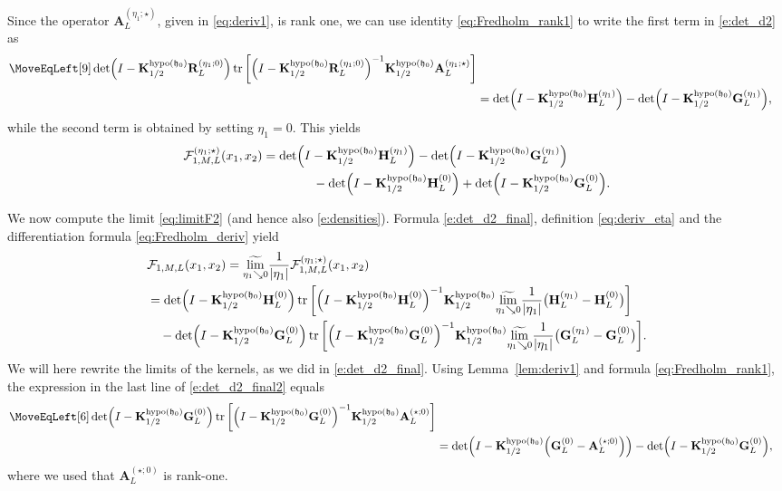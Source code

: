 \documentclass[oneside,final,11pt]{amsart}
\theoremstyle{definition}
\newcommand{\fh}{\mathfrak{h}}
\newcommand{\mylim}[1]{\underset{#1}{\wt{\mathrm{lim}}}}
\newcommand{\dens}{\CF}
\newcommand{\1}[1]{\mathbf{1}_{#1}}
\newcommand{\wt}{\widetilde}
\newcommand{\uptext}[1]{\text{\upshape{#1}}}
\DeclareMathOperator{\hypo}{\uptext{hypo}}
\DeclareMathOperator{\tr}{\mathop{\uptext{tr}}}
\newcommand{\fA}{\mathbf{A}}
\newcommand{\fK}{\mathbf{K}}
\newcommand{\fR}{\mathbf{R}}
\newcommand{\fG}{\mathbf{G}}
\newcommand{\fH}{\mathbf{H}}
\newcommand{\CF}{\mathcal{F}}
\numberwithin{equation}{section}
\begin{document}
Since the operator $\fA_L^{(\eta_1; \star)}$, given in  \eqref{eq:deriv1}, is rank one, we can use identity \eqref{eq:Fredholm_rank1} to write the first term in \eqref{e:det_d2} as
\begin{align}
\MoveEqLeft[9]
\det \Bigl(I- \fK^{\hypo(\fh_0)}_{1/2} \fR_L^{(\eta_1; 0)} \Bigr) \tr\bigg[\Bigl(I - \fK^{\hypo(\fh_0)}_{1/2} \fR_L^{(\eta_1; 0)}\Bigr)^{-1} \fK^{\hypo(\fh_0)}_{1/2} \fA_L^{(\eta_1; \star)}\bigg]\\
&= \det\Bigl(I- \fK^{\hypo(\fh_0)}_{1/2} \fH_L^{(\eta_1)} \Bigr) - \det\Bigl(I- \fK^{\hypo(\fh_0)}_{1/2} \fG_L^{(\eta_1)}\Bigr),
\end{align}
while the second term is obtained by setting $\eta_1 = 0$. This yields
\begin{align}
 \dens^{(\eta_1; \star)}_{1, M, L}(x_1, x_2) &= \det\Bigl(I- \fK^{\hypo(\fh_0)}_{1/2} \fH_L^{(\eta_1)} \Bigr) - \det\Bigl(I- \fK^{\hypo(\fh_0)}_{1/2} \fG_L^{(\eta_1)}\Bigr) \\
&\qquad \qquad  - \det\Bigl(I- \fK^{\hypo(\fh_0)}_{1/2} \fH_L^{(0)} \Bigr) + \det\Bigl(I- \fK^{\hypo(\fh_0)}_{1/2} \fG_L^{(0)}\Bigr).\label{e:det_d2_final}
 \end{align}

We now compute the limit \eqref{eq:limitF2} (and hence also \eqref{e:densities}). Formula \eqref{e:det_d2_final}, definition \eqref{eq:deriv_eta} and the differentiation formula \eqref{eq:Fredholm_deriv} yield
\begin{equation}
\begin{split}
&\dens_{1, M, L}(x_1, x_2) = \mylim{\eta_1 \searrow 0} \frac{1}{|\eta_1|} \dens^{(\eta_1; \star)}_{1, M, L}(x_1, x_2) \\
&= \det\Bigl(I- \fK^{\hypo(\fh_0)}_{1/2} \fH_L^{(0)}\Bigr) \tr\bigg[\Bigl(I- \fK^{\hypo(\fh_0)}_{1/2} \fH_L^{(0)}\Bigr)^{-1}  \fK^{\hypo(\fh_0)}_{1/2}  \mylim{\eta_1 \searrow 0} \frac{1}{|\eta_1|} \bigl( \fH_L^{(\eta_1)} - \fH_L^{(0)}\bigr)\bigg]\\
&\quad - \det\Bigl(I-\fK^{\hypo(\fh_0)}_{1/2} \fG_L^{(0)}\Bigr) \tr\bigg[\Bigl(I- \fK^{\hypo(\fh_0)}_{1/2} \fG_L^{(0)}\Bigr)^{-1} \fK^{\hypo(\fh_0)}_{1/2} \mylim{\eta_1 \searrow 0} \frac{1}{|\eta_1|} \bigl( \fG_L^{(\eta_1)} - \fG_L^{(0)}\bigr)\bigg].
\end{split}
\label{e:det_d2_final2}
\end{equation}
We will here rewrite the limits of the kernels, as we did  in \eqref{e:det_d2_final}. Using Lemma~\ref{lem:deriv1} and formula \eqref{eq:Fredholm_rank1}, the expression in the last line of \eqref{e:det_d2_final2} equals
\begin{align}
 \MoveEqLeft[6]
 \det \Bigl(I-\fK^{\hypo(\fh_0)}_{1/2} \fG_L^{(0)}\Bigr) \tr\bigg[\Bigl(I-\fK^{\hypo(\fh_0)}_{1/2} \fG_L^{(0)}\Bigr)^{-1} \fK^{\hypo(\fh_0)}_{1/2} \fA_L^{(\star; 0)}\bigg]\\
&= \det \Bigl(I- \fK^{\hypo(\fh_0)}_{1/2} \Bigl(\fG_L^{(0)} - \fA_L^{(\star; 0)}\Bigr) \Bigr) - \det \Bigl(I-\fK^{\hypo(\fh_0)}_{1/2} \fG_L^{(0)}\Bigr),\label{e:det2_d1_final}
\end{align}
where we used that $\fA_L^{(\star; 0)}$ is rank-one.
\end{document}

